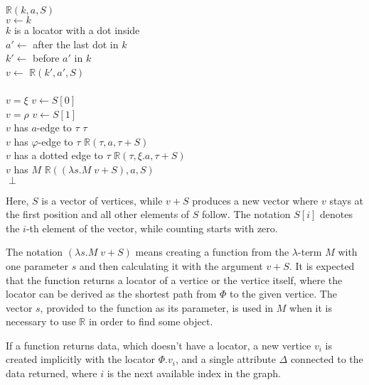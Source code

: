 \begin{twocols}
\begin{algo}
 \(\mathbb{R}(k,a,S)\) \\
  \tab \(v \gets k\) \\
  \tab {} \(k\) is a locator with a dot inside \\
  \tab\tab \(a' \gets\) after the last dot in \(k\) \\
  \tab\tab \(k' \gets\) before \(a'\) in \(k\) \\
  \tab\tab \(v \gets\) \(\mathbb{R}(k', a', S)\) \\
  \tab {} \\
  \tab {} \(v = \xi\)  \(v \gets S[0]\) \\
  \tab {} \(v = \rho\)  \(v \gets S[1]\) \\
  \tab {} \(v\) has \(a\)-edge to \(\tau\)   \(\tau\) \\
  \tab {} \(v\) has \(\varphi\)-edge to \(\tau\)   \(\mathbb{R}(\tau, a, \tau + S)\) \\
  \tab {} \(v\) has a dotted edge to \(\tau\)   \(\mathbb{R}(\tau, \xi.a, \tau + S)\) \\
  \tab {} \(v\) has \(M\)   \(\mathbb{R}((\lambda s.M \; v + S), a, S)\) \\
  \tab {} \(\perp\) \\
\end{algo}
\end{twocols}

Here, \(S\) is a vector of vertices, while \(v+S\) produces a new vector
where \(v\) stays at the first position and all other elements of \(S\) follow.
The notation \(S[i]\) denotes the \(i\)-th element of the vector, while
counting starts with zero.

The notation \((\lambda s.M \; v + S)\) means creating a function from
the \(\lambda\)-term \(M\) with one parameter \(s\) and then calculating
it with the argument \(v + S\).
It is expected that the function returns a locator of a vertice or
the vertice itself, where the locator can be derived as
the shortest path from \(\Phi\) to the given vertice.
The vector \(s\), provided to the
function as its parameter, is used in \(M\) when it is necessary
to use \(\mathbb{R}\) in order to find some object.

If a function returns data, which doesn't have a locator, a new vertice
\(v_i\) is created implicitly with the locator \(\Phi.v_i\), and
a single attribute \(\Delta\) connected to the data returned, where
\(i\) is the next available index in the graph.

